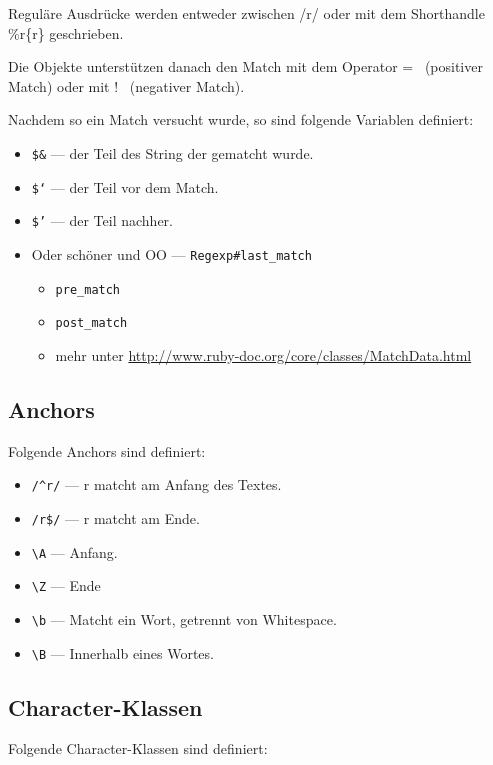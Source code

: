 \documentclass[a4book,11pt,twoside]{scrbook}
\begin{document}
Reguläre Ausdrücke werden entweder zwischen /r/ oder mit dem Shorthandle \%r\{r\} geschrieben.



Die Objekte unterstützen danach den Match mit dem Operator =~ (positiver Match) oder mit !~ (negativer Match).

Nachdem so ein Match versucht wurde, so sind folgende Variablen definiert:

\begin{itemize}
	\item \texttt{\$\&} — der Teil des String der gematcht wurde.
	\item \texttt{\$`} — der Teil vor dem Match.
	\item \texttt{\$'} — der Teil nachher.
	\item Oder schöner und OO — \texttt{Regexp\#last\_match}
	\begin{itemize}
		\item \texttt{pre\_match}
		\item \texttt{post\_match}
		\item mehr unter \url{http://www.ruby-doc.org/core/classes/MatchData.html}
	\end{itemize}
\end{itemize}



\subsection*{Anchors} %
\label{ssub:anchors}
Folgende Anchors sind definiert:

\begin{itemize}
	\item \lstinline{/^r/}  — r matcht am Anfang des Textes.
	\item \texttt{/r\$/} — r matcht am Ende.
	\item \lstinline{\A}  — Anfang.
	\item \lstinline{\Z}  — Ende
	\item \lstinline{\b} — Matcht ein Wort, getrennt von Whitespace.
	\item \lstinline{\B} — Innerhalb eines Wortes.
\end{itemize}




\subsection*{Character-Klassen} %
\label{sub:character_klassen}
Folgende Character-Klassen sind definiert:
\end{document}
